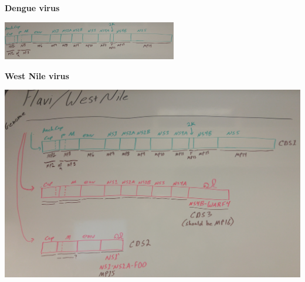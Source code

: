 \documentclass[landscape]{slides}
\begin{document}
\begin{slide}
\begin{center}
\textbf{Dengue virus}

\includegraphics[width=3in]{figs/dengue-eneida}

\end{center}
\vfill
\end{slide}
\begin{slide}
\textbf{West Nile virus}

\begin{center}
\includegraphics[width=8in]{figs/flavi-wnv-eneida}
\end{center}
\vfill
\end{slide}
\end{document}
